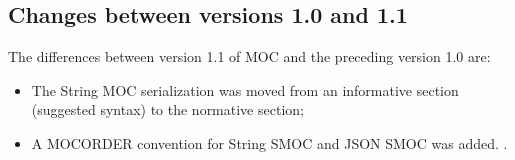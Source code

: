 \documentclass[11pt,a4paper]{ivoa}
\begin{document}
\subsection{Changes between versions 1.0 and 1.1}
The differences between version 1.1 of MOC and the preceding version
1.0 are:
\begin{itemize}
   \item The String MOC serialization was moved from an informative
     section (suggested syntax) to the normative section;
   \item A MOCORDER convention for String SMOC and JSON SMOC was added.
     \citep{2020arXiv200707519D}.
\end{itemize}




\end{document}

